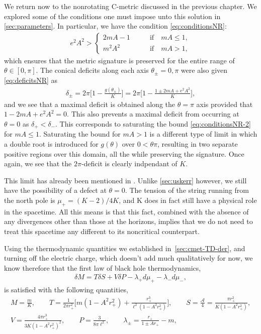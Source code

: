 \documentclass[
twoside,
openright,
frontopenright,
]{dmathesis}
\newcommand{\nn}{\nonumber}
\begin{document}
We return now to the nonrotating C-metric discussed in the previous chapter. We
explored some of the conditions one must impose unto this solution in
\cref{sec:parameters}. In particular, we have the condition
\eqref{eq:conditionsNR}:
\begin{align}
  \label{eq:conditionsNR-2}
  e^2A^2 >
  \begin{cases}
    2mA - 1 \qquad &\mbox{if} \quad mA \leqslant 1,\\
    m^2A^2 \qquad &\mbox{if} \quad mA > 1,
  \end{cases}
\end{align}
which ensures that the metric signature is preserved for the entire range of
$\theta\in [0,\pi]$. The conical deficits along each axis $\theta_\pm = 0,\pi$
were also given \eqref{eq:deficitsNR} as
\begin{align}
  \label{eq:deficitsNR-2}
  \delta_\pm=2\pi\bigg[1-\frac{g(\theta_\pm)}{K}\bigg] = 2\pi\bigg[1-\frac{1\pm
  2mA + e^2A^2}{K}\bigg],
\end{align}
and we see that a maximal deficit is obtained along the $\theta = \pi$ axis
provided that $1-2mA + e^2 A^2 = 0$. This also prevents a maximal deficit from
occurring at $\theta = 0$ as $\delta_+<\delta_-$. This corresponds to saturating
the bound \eqref{eq:conditionsNR-2} for $mA \leqslant 1$. Saturating the bound
for $mA > 1$ is a different type of limit in which a double root is introduced
for $g(\theta)$ over $0<\theta\pi$, resulting in two separate positive regions
over this domain, all the while preserving the signature. Once again, we see
that the $2\pi$-deficit is clearly indpendant of $K$.

This limit has already been mentioned in
\cite{Chen:2015vma,Hubeny:2009ru}. Unlike \cref{sec:uskerr} however, we still
have the possibility of a defect at $\theta = 0$. The tension of the string
running from the north pole is $\mu_+ = (K-2)/4K$, and K does in fact still have
a physical role in the spacetime. All this means is that this fact, combined
with the absence of any divergences other than those at the horizons, implies
that we do not need to treat this spacetime any different to its noncritical
counterpart.

Using the thermodynamic quantities we established in~\cref{sec:cmet-TD-der}, and
turning off the electric charge, which doesn't add much qualitatively for now,
we know therefore that the first law of black hole thermodynamics,
\begin{align}\label{eq:firstlawnr}
  \delta M = T\delta S + V\delta P - \lambda_+ d\mu_+ - \lambda_- d\mu_-,
\end{align}
is satisfied with the following quantities,
\begin{gather}
  M=\frac{m}{K},\qquad T=\frac{1}{2\pi
    r_+^2}\bigg[m(1-A^2 r_+^2) + \frac{r_+^3}{\ell^2(1-A^2 r_+^2)}\bigg], \qquad
  S=\frac{\mathcal{A}}{4} = \frac{\pi r_+^2}{K(1- A^2 r_+^2)},\nn\\ 
  V=\frac{4 \pi  r_+^3}{3 K (1- A^2 r_+^2)^2}, \qquad P=\frac{3}{8\pi \ell^2},
  \qquad \lambda_\pm = \frac{r_+}{1\pm A r_+} - m,
\end{gather}
\end{document}
